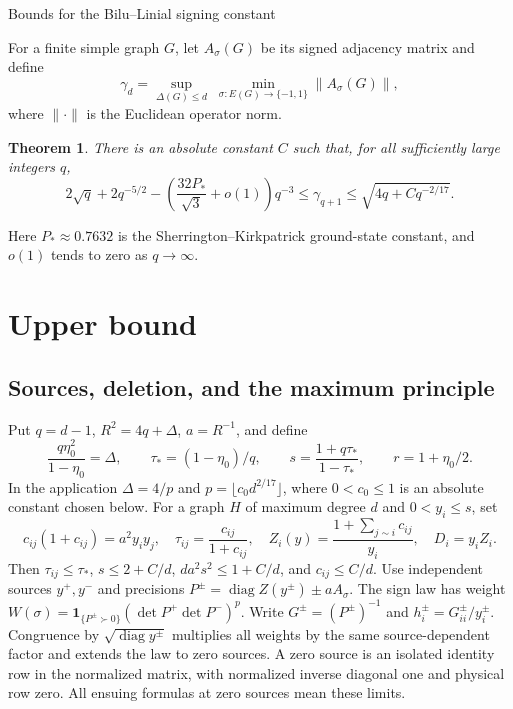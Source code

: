\documentclass[10pt]{article}
\numberwithin{equation}{section}
\newtheorem{theorem}{Theorem}
\newcommand{\1}{\mathbf1}
\begin{document}
\begin{center}
{\Large Bounds for the Bilu--Linial signing constant}
\end{center}
For a finite simple graph $G$, let $A_\sigma(G)$ be its signed adjacency
matrix and define
\[
 \gamma_d=\sup_{\Delta(G)\le d}\;
       \min_{\sigma:E(G)\to\{-1,1\}}\|A_\sigma(G)\|,
\]
where $\|\cdot\|$ is the Euclidean operator norm.
\begin{theorem}\label{thm:bounds}
There is an absolute constant $C$ such that, for all sufficiently large
integers $q$,
\[
 2\sqrt q+2q^{-5/2}
 -\left(\frac{32P_*}{\sqrt3}+o(1)\right)q^{-3}
 \le\gamma_{q+1}\le\sqrt{4q+Cq^{-2/17}}.
\]
\end{theorem}
Here $P_*\approx0.7632$ is the Sherrington--Kirkpatrick ground-state
constant, and $o(1)$ tends to zero as $q\to\infty$.

\section{Upper bound}

\subsection{Sources, deletion, and the maximum principle}
Put $q=d-1$, $R^2=4q+\Delta$, $a=R^{-1}$, and define
\[
 \frac{q\eta_0^2}{1-\eta_0}=\Delta,\qquad
 \tau_*=(1-\eta_0)/q,\qquad
 s=\frac{1+q\tau_*}{1-\tau_*},\qquad r=1+\eta_0/2.
\]
In the application $\Delta=4/p$ and
$p=\lfloor c_0d^{2/17}\rfloor$, where $0<c_0\le1$ is an absolute
constant chosen below.
For a graph $H$ of maximum degree $d$ and $0<y_i\le s$, set
\[
 c_{ij}(1+c_{ij})=a^2y_iy_j,\quad
 \tau_{ij}=\frac{c_{ij}}{1+c_{ij}},\quad
 Z_i(y)=\frac{1+\sum_{j\sim i}c_{ij}}{y_i},\quad D_i=y_iZ_i.
\]
Then $\tau_{ij}\le\tau_*$, $s\le2+C/d$,
$da^2s^2\le1+C/d$, and $c_{ij}\le C/d$.
Use independent sources $y^+,y^-$ and precisions
$P^\pm=\operatorname{diag}Z(y^\pm)\pm aA_\sigma$.
The sign law has weight
$W(\sigma)=\mathbf1_{\{P^\pm\succ0\}}(\det P^+\det P^-)^p$.
Write $G^\pm=(P^\pm)^{-1}$ and $h_i^\pm=G^\pm_{ii}/y_i^\pm$.
Congruence by $\sqrt{\operatorname{diag}y^\pm}$ multiplies all
weights by the same source-dependent factor and extends the law
to zero sources. A zero source is an isolated identity row in the
normalized matrix, with normalized inverse diagonal one and physical
row zero. All ensuing formulas at zero sources mean these limits.
\end{document}
